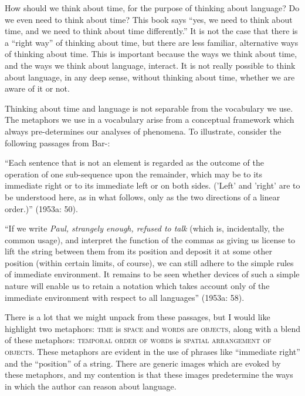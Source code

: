 \addchap{\lsPrefaceTitle}
  

How should we think about time, for the purpose of thinking about language? Do we even need to think about time? This book says “yes, we need to think about time, and we need to think about time differently.” It is not the case that there is a “right way” of thinking about time, but there are less familiar, alternative ways of thinking about time. This is important because the ways we think about time, and the ways we think about language, interact. It is not really possible to think about language, in any deep sense, without thinking about time, whether we are aware of it or not. 

  Thinking about time and language is not separable from the vocabulary we use. The metaphors we use in a vocabulary arise from a conceptual framework which always pre-determines our analyses of phenomena. To illustrate, consider the following passages from Bar-\citet{Hillel1953a}:

“Each sentence that is not an element is regarded as the outcome of the operation of one sub-sequence upon the remainder, which may be to its immediate right or to its immediate left or on both sides. ('Left' and 'right' are to be understood here, as in what follows, only as the two directions of a linear order.)” (1953a: 50).

“If we write \textit{Paul, strangely enough, refused to talk} (which is, incidentally, the common usage), and interpret the function of the commas as giving us license to lift the string between them from its position and deposit it at some other position (within certain limits, of course), we can still adhere to the simple rules of immediate environment. It remains to be seen whether devices of such a simple nature will enable us to retain a notation which takes account only of the immediate environment with respect to all languages” (1953a: 58).

There is a lot that we might unpack from these passages, but I would like highlight two metaphors: \textsc{time} is \textsc{space} and \textsc{words} are \textsc{objects}, along with a blend of these metaphors: \textsc{temporal order of words} is \textsc{spatial arrangement of objects}. These metaphors are evident in the use of phrases like “immediate right” and the “position” of a string. There are generic images which are evoked by these metaphors, and my contention is that these images predetermine the ways in which the author can reason about language. 


